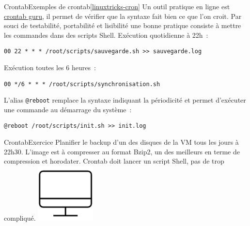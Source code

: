 \documentclass{beamer}
\begin{document}
    \begin{frame}[fragile]{Crontab}{Exemples de crontab\cref{linuxtricks-cron}}
        Un outil pratique en ligne est \href{https://crontab.guru/}{crontab guru}, il permet de vérifier que la syntaxe fait bien ce que l'on croit.
        \bigbreak
        Par souci de testabilité, portabilité et lisibilité une bonne pratique consiste à mettre les commandes dans des scripts Shell.
        \bigbreak
        Exécution quotidienne à 22h~:
        \begin{lstlisting}
00 22 * * * /root/scripts/sauvegarde.sh >> sauvegarde.log
        \end{lstlisting}

        Exécution toutes les 6 heures~:
        \begin{lstlisting}
00 */6 * * * /root/scripts/synchronisation.sh
        \end{lstlisting}
        \bigbreak
        L'alias \lstinline{@reboot} remplace la syntaxe indiquant la périodicité et permet d'exécuter une commande au démarrage du système~:
        \begin{lstlisting}
@reboot /root/scripts/init.sh >> init.log
        \end{lstlisting}
    \end{frame}

    \begin{frame}{Crontab}{Exercice \execcounterdispinc{}}
        Planifier le backup d'un des disques de la VM tous les jours à 22h30.
        L'image est à compresser au format Bzip2, un des meilleurs en terme de compression et horodater.
        \bigbreak
        Crontab doit lancer un script Shell, pas de  trop compliqué.
        \bigbreak
        \centering
        \includegraphics[width=3cm]{image/desktop}
    \end{frame}
\end{document}
